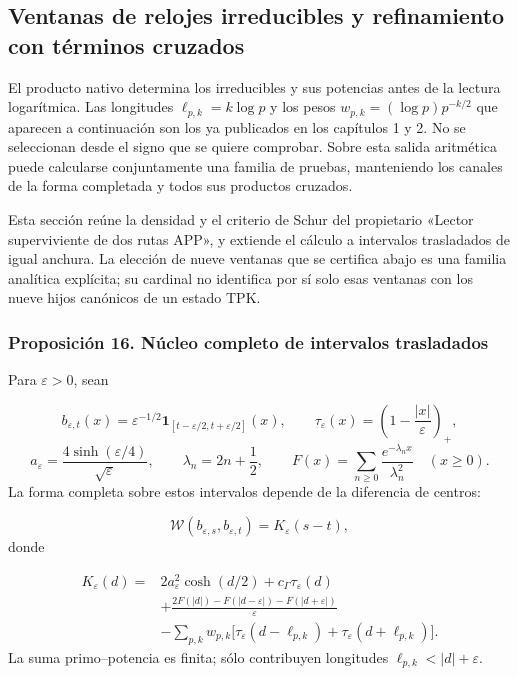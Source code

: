 \subsection{Ventanas de relojes irreducibles y refinamiento con términos cruzados}
El producto nativo determina los irreducibles y sus potencias antes de la lectura logarítmica. Las longitudes \(\ell_{p,k}=k\log p\) y los pesos \(w_{p,k}=(\log p)p^{-k/2}\) que aparecen a continuación son los ya publicados en los capítulos 1 y 2. No se seleccionan desde el signo que se quiere comprobar. Sobre esta salida aritmética puede calcularse conjuntamente una familia de pruebas, manteniendo los canales de la forma completada y todos sus productos cruzados.

Esta sección reúne la densidad y el criterio de Schur del propietario «Lector superviviente de dos rutas APP», y extiende el cálculo a intervalos trasladados de igual anchura. La elección de nueve ventanas que se certifica abajo es una familia analítica explícita; su cardinal no identifica por sí solo esas ventanas con los nueve hijos canónicos de un estado TPK.

\subsubsection*{Proposición 16. Núcleo completo de intervalos trasladados}
Para \(\varepsilon>0\), sean

\[
b_{\varepsilon,t}(x)=\varepsilon^{-1/2}
\mathbf1_{[t-\varepsilon/2,t+\varepsilon/2]}(x),\qquad
\tau_\varepsilon(x)=\left(1-\frac{|x|}{\varepsilon}\right)_+,
\]
\[
a_\varepsilon=\frac{4\sinh(\varepsilon/4)}{\sqrt\varepsilon},
\qquad \lambda_n=2n+\frac12,\qquad
F(x)=\sum_{n\geq0}\frac{e^{-\lambda_nx}}{\lambda_n^2}
\quad(x\geq0).
\]
La forma completa sobre estos intervalos depende de la diferencia de centros:

\[
\mathscr W(b_{\varepsilon,s},b_{\varepsilon,t})
=K_\varepsilon(s-t),
\]
donde

\[
\begin{aligned}
K_\varepsilon(d)={}&2a_\varepsilon^2\cosh(d/2)
+c_\Gamma\tau_\varepsilon(d)\\
&+\frac{2F(|d|)-F(|d-\varepsilon|)-F(|d+\varepsilon|)}{\varepsilon}\\
&-\sum_{p,k}w_{p,k}\bigl[
\tau_\varepsilon(d-\ell_{p,k})+
\tau_\varepsilon(d+\ell_{p,k})\bigr].
\end{aligned}
\]
La suma primo–potencia es finita; sólo contribuyen longitudes \(\ell_{p,k}<|d|+\varepsilon\).

